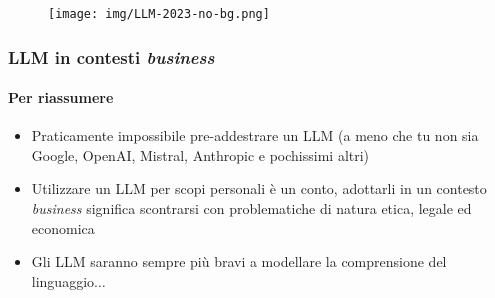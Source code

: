 \begin{frame}[t]
{\begin{minipage}[b]{\textwidth}
{\begin{figure}
                \centering
                \texttt{[image: img/LLM-2023-no-bg.png]}
            \end{figure}
        }
    \end{minipage}
}
\end{frame}
%
\begin{frame}[t] \frametitle{LLM in contesti \emph{business}}
\framesubtitle{Per riassumere}
{\footnotesize
{}
    \begin{minipage}[t]{\textwidth}
        \begin{itemize}[leftmargin=10pt,align=right]
            \item[\alert{\faArrowCircleRight}] Praticamente impossibile pre-addestrare un LLM (a meno che tu non sia Google, OpenAI, Mistral, Anthropic e pochissimi altri)
            \item[\alert{\faArrowCircleRight}] Utilizzare un LLM per scopi personali è un conto, adottarli in un contesto \emph{business} significa scontrarsi con problematiche di natura etica, legale ed economica
            \item[\alert{\faArrowCircleRight}] Gli LLM saranno sempre più bravi a modellare la comprensione del linguaggio$\ldots$
        \end{itemize}
        \vspace*{.5cm}
    \end{minipage}
}
\end{frame}
